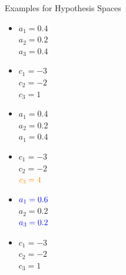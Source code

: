 \documentclass[11pt,compress,t,notes=noshow, xcolor=table]{beamer}
\begin{document}
\begin{vbframe}{Examples for Hypothesis Spaces}
\begin{center}
\centering  

\begin{minipage}{0.33\textwidth}
  \footnotesize
  \begin{itemize}
    \item $a_1 = 0.4$ \\
    $a_2 = 0.2$ \\
    $a_3 = 0.4$
    \item $c_1 = -3$ \\
    $c_2 = -2$ \\
    $c_3 = 1$
  \end{itemize}
\end{minipage}%
\begin{minipage}{0.33\textwidth}
  \footnotesize
  \begin{itemize}
    \item $a_1 = 0.4$ \\
    $a_2 = 0.2$ \\
    $a_1 = 0.4$
    \item $c_1 = -3$ \\
    $c_2 = -2$ \\
    $\textcolor{orange}{c_3 = 4}$  \end{itemize}
\end{minipage}%
\begin{minipage}{0.33\textwidth}
  \footnotesize
  \begin{itemize}
    \item $\textcolor{blue}{a_1 = 0.6}$ \\
    $a_2 = 0.2$ \\
    $\textcolor{blue}{a_3 = 0.2}$
    \item $c_1 = -3$ \\
    $c_2 = -2$ \\
    $c_3 = 1$
  \end{itemize}
\end{minipage}
\normalsize

\end{center}

\end{vbframe}


\endlecture
\end{document}
